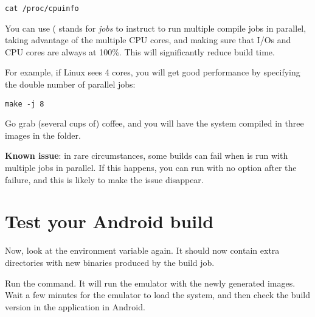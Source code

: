 \begin{verbatim}
cat /proc/cpuinfo
\end{verbatim}

You can use  ( stands for {\it jobs} to instruct 
to run multiple compile jobs in parallel, taking advantage of the multiple
CPU cores, and making sure that I/Os
and CPU cores are always at 100\%. This will significantly reduce build time.

For example, if Linux sees 4 cores, you will get good performance by specifying  
the double number of parallel jobs: 

\begin{verbatim}
make -j 8
\end{verbatim}

Go grab (several cups of) coffee, and you will have the system compiled in three
images in the  folder.

\textbf{Known issue}: in rare circumstances, some builds can fail when 
is run with multiple jobs in parallel. If this happens, you can run 
with no option after the failure, and this is likely to make the issue disappear.

\section{Test your Android build}

Now, look at the  environment variable again. It should now contain
extra directories with new binaries produced by the build job.

Run the  command. It will run the emulator with the newly generated images.
Wait a few minutes for the emulator to load the system, and then 
check the build version in the  application in Android.
